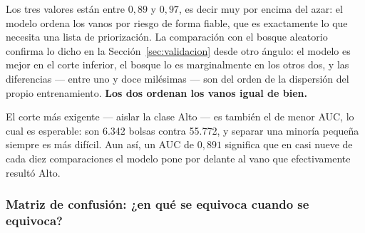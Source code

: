 \documentclass[11pt,a4paper]{article}
\begin{document}
\begin{bloquenuevo}
Los tres valores están entre $0{,}89$ y $0{,}97$, es decir muy por encima del azar: el modelo
ordena los vanos por riesgo de forma fiable, que es exactamente lo que necesita una lista de
priorización. La comparación con el bosque aleatorio confirma lo dicho en la
Sección~\ref{sec:validacion} desde otro ángulo: el modelo es mejor en el corte inferior, el
bosque lo es marginalmente en los otros dos, y las diferencias --- entre uno y doce milésimas
--- son del orden de la dispersión del propio entrenamiento. \textbf{Los dos ordenan los vanos
igual de bien.}

El corte más exigente --- aislar la clase Alto --- es también el de menor AUC, lo cual es
esperable: son 6.342 bolsas contra 55.772, y separar una minoría pequeña siempre es más
difícil. Aun así, un AUC de $0{,}891$ significa que en casi nueve de cada diez comparaciones
el modelo pone por delante al vano que efectivamente resultó Alto.
\end{bloquenuevo}

\subsubsection{Matriz de confusión: ¿en qué se equivoca cuando se equivoca?}
\end{document}
